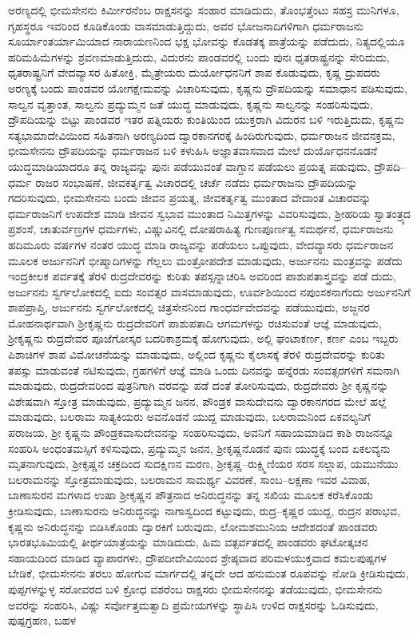 ಅರಣ್ಯದಲ್ಲಿ ಭೀಮಸೇನನು ಕಿರ್ಮೀರನೆಂಬ ರಾಕ್ಷಸನನ್ನು ಸಂಹಾರ ಮಾಡಿದುದು, ತೊಂಭತ್ತೆಂಟು ಸಹಸ್ರ ಮುನಿಗಳೂ, ಗೃಹಸ್ಥರೂ ಇವರಿಂದ ಕೂಡಿಕೊಂಡು ವಾಸಮಾಡುತ್ತಿದ್ದುದು, ಅವರ ಭೋಜನಾದಿಗಳಿಗಾಗಿ ಧರ್ಮರಾಜನು ಸೂರ್ಯಾಂತರ್ಯಾಮಿಯಾದ ನಾರಾಯಣನಿಂದ ಭಕ್ಷ ಭೋವನ್ನು ಕೊಡತಕ್ಕ ಪಾತ್ರೆಯನ್ನು ಪಡೆದುದು, ನಿತ್ಯದಲ್ಲಿಯೂ ಹರಿಮಹಿಮೆಗಳನ್ನು ಶ್ರವಣಮಾಡುತ್ತಿದುದು, ವಿದುರನು ಪಾಂಡವರಲ್ಲಿ ಬಂದು ಪುನಃ ಧೃತರಾಷ್ಟ್ರನನ್ನು ಸೇರಿದುದು, ಧೃತರಾಷ್ಟ್ರನಿಗೆ ವೇದವ್ಯಾಸರ ಹಿತೋಕ್ತಿ, ಮೈತ್ರೇಯರು ದುರ್ಯೋಧನನಿಗೆ ಶಾಪ ಕೊಡುವುದು, ಕೃಷ್ಣ ದ್ರುಪದರು ಅರಣ್ಯಕ್ಕೆ ಬಂದು ಪಾಂಡವರ ಯೋಗಕ್ಷೇಮವನ್ನು ವಿಚಾರಿಸುವುದು, ಕೃಷ್ಣನು ದ್ರೌಪದಿಯನ್ನು ಸಮಾಧಾನ ಪಡಿಸುವುದು, ಸಾಲ್ವನ ವೃತ್ತಾಂತ, ಸಾಲ್ವನು ಪ್ರದ್ಯುಮ್ಮನ ಜತೆ ಯುದ್ಧ ಮಾಡುವುದು, ಕೃಷ್ಣನು ಸಾಲ್ವನನ್ನು ಸಂಹರಿಸುವುದು, ದ್ರೌಪದಿಯನ್ನು ಬಿಟ್ಟು ಪಾಂಡವರ ಇತರ ಪತ್ನಿಯರು ಕುಂತಿಯಿಂದ ಯುಕ್ತರಾಗಿ ವಿದುರನ ಬಳಿ ಇರುತ್ತಿದುದು, ಕೃಷ್ಣನು ಸತ್ಯಭಾಮಾದೇವಿಯಿಂದ ಸಹಿತನಾಗಿ ಅರಣ್ಯದಿಂದ ದ್ವಾರಕಾನಗರಕ್ಕೆ ಹಿಂದಿರುಗುವುದು, ಧರ್ಮರಾಜನ ಜೀವನಕ್ರಮ, ಭೀಮಸೇನನು ದ್ರೌಪದಿಯನ್ನು ಧರ್ಮರಾಜನ ಬಳಿ ಕಳುಹಿಸಿ ಅಜ್ಞಾತವಾಸವಾದ ಮೇಲೆ ದುರ್ಯೊಧನನೊಡನೆ ಯುದ್ಧಮಾಡಿಯಾದರೂ ತನ್ನ ರಾಜ್ಯವನ್ನು ಪುನಃ ಪಡೆಯುವಂತೆ ವಾಗ್ದಾನ ಪಡೆಯಲು ಪ್ರಯತ್ನ ಪಡುವುದು, ದ್ರೌಪದಿ–ಧರ್ಮ ರಾಜರ ಸಂಭಾಷಣೆ, ಜೀವಕರ್ತೃತ್ವ ವಿಚಾರದಲ್ಲಿ ಚರ್ಚೆ ನಡೆದು ಧರ್ಮರಾಜನು ದ್ರೌಪದಿಯನ್ನು ಗದರಿಸುವುದು, ಭೀಮಸೇನನು ಬಂದು ಜೀವನ ಪ್ರಯತ್ನ, ಜೀವಕರ್ತೃತ್ವ ಮುಂತಾದ ವೇದಾಂತ ವಿಚಾರವನ್ನು ಧರ್ಮರಾಜನಿಗೆ ಉಪದೇಶ ಮಾಡಿ ಜೀವನ ಸ್ವಭಾವ ಮುಂತಾದ ನಿಮಿತ್ತಗಳನ್ನು ವಿವರಿಸುವುದು, ಶ‍್ರೀಹರಿಯ ಸ್ವಾತಂತ್ರ್ಯದ ಪ್ರಶಂಸೆ, ಚಾತುರ್ವಣ್ರಗಳ ಧರ್ಮಗಳು, ವಿಷ್ಣುವಿನಲ್ಲಿ ದೋಷರಾಹಿತ್ಯ ಗುಣಪೂರ್ಣತ್ವ ಸಮರ್ಥನೆ, ಧರ್ಮರಾಜನು ಹದಿಮೂರು ವರ್ಷಗಳ ನಂತರ ಯುದ್ಧ ಮಾಡಿ ರಾಜ್ಯವನ್ನು ಪಡೆಯಲು ಒಪ್ಪುವುದು, ವೇದವ್ಯಾಸರು ಧರ್ಮರಾಜನ ಮೂಲಕ ಅರ್ಜುನನಿಗೆ ಭೀಷ್ಮಾದಿಗಳನ್ನು ಗೆಲ್ಲಲು ಮಂತ್ರೋಪದೇಶ ಮಾಡುವುದು, ಅರ್ಜುನನು ಮಂತ್ರವನ್ನು ಪಡೆದು ಇಂದ್ರಕೀಲಕ ಪರ್ವತಕ್ಕೆ ತೆರಳಿ ರುದ್ರದೇವರನ್ನು ಕುರಿತು ತಪಸ್ಸನ್ನಾಚರಿಸಿ ಅವರಿಂದ ಪಾಶುಪತಾಸ್ತ್ರವನ್ನು ಪಡೆ ದುದು, ಅರ್ಜುನನು ಸ್ವರ್ಗಲೋಕದಲ್ಲಿ ಐದು ಸಂವತ್ಸರ ವಾಸಮಾಡುವುದು, ಊರ್ವಶಿಯಿಂದ ನಪುಂಸಕನಾಗೆಂದು ಅರ್ಜುನನಿಗೆ ಶಾಪಪ್ರಾಪ್ತಿ, ಅರ್ಜುನನು ಸ್ವರ್ಗಲೋಕದಲ್ಲಿ ಚಿತ್ರಸೇನನಿಂದ ಗಾಂಧರ್ವವೇದವನ್ನು ಪಡೆಯುವುದು, ಅಜ್ಜನರ ಮೋಹನಾರ್ಥವಾಗಿ ಶ‍್ರೀಕೃಷ್ಣನು ರುದ್ರದೇವರಿಗೆ ಪಾಶುಪತಾದಿ ಆಗಮಗಳನ್ನು ರಚಿಸುವಂತೆ ಆಜ್ಞೆ ಮಾಡುವುದು, ಶ‍್ರೀಕೃಷ್ಣನು ರುದ್ರದೇವರ ಪೂಜೆಗೋಸ್ಕರ ಬದರಿಕಾಶ್ರಮಕ್ಕೆ ಹೋಗುವುದು, ಅಲ್ಲಿ ಘಂಟಾಕರ್ಣ, ಕರ್ಣ ಎಂಬ ಇಬ್ಬರು ಪಿಶಾಚಿಗಳ ಶಾಪ ವಿಮೋಚನೆಯನ್ನು ಮಾಡುವುದು, ಅಲ್ಲಿಂದ ಕೃಷ್ಣನು ಕೈಲಾಸಕ್ಕೆ ತೆರಳಿ ರುದ್ರದೇವರನ್ನು ಕುರಿತು ತಪಸ್ಸು ಮಾಡುವಂತೆ ನಟಿಸುವುದು, ಗ್ರಹಗಳಿಗೆ ಆಜ್ಞೆ ಮಾಡಿ ಒಂದು ದಿನವನ್ನು ಹನ್ನೆರಡು ಸಂವತ್ಸರಗಳಿಗೆ ಸಮನಾಗಿ ಮಾಡುವುದು, ರುದ್ರದೇವರಿಂದ ಪುತ್ರನಿಗಾಗಿ ವರವನ್ನು ಪಡೆ ದಂತೆ ತೋರಿಸುವುದು, ರುದ್ರದೇವರು ಶ‍್ರೀ ಕೃಷ್ಣನನ್ನು ವಿಶೇಷವಾಗಿ ಸ್ತೋತ್ರ ಮಾಡುವುದು, ಪ್ರದ್ಯುಮ್ಮನ ಜನನ, ಪೌಂಡ್ರಕ ವಾಸುದೇವನು ದ್ವಾರಕಾನಗರದ ಮೇಲೆ ಹಲ್ಲೆ ಮಾಡುವುದು, ಬಲರಾಮ ಸಾತ್ಯಕಿಯರು ಅವನೊಡನೆ ಯುದ್ದ ಮಾಡುವುದು, ಬಲರಾಮನಿಂದ ಏಕವಲ್ಯನಿಗೆ ಪರಾಜಯ, ಶ‍್ರೀ ಕೃಷ್ಣನು ಪೌಂಡ್ರಕವಾಸುದೇವನನ್ನು ಸಂಹರಿಸುವುದು, ಅವನಿಗೆ ಸಹಾಯಮಾಡಿದ ಕಾಶಿ ರಾಜನನ್ನೂ ಸಂಹರಿಸಿ ಅಂಧಂತಮಸ್ಸಿಗೆ ಕಳಿಸುವುದು, ಪ್ರದ್ಯುಮ್ಮನ ಜನನ, ಶ‍್ರೀಕೃಷ್ಣನೊಡನೆ ಪುನಃ ಯುದ್ಧಕ್ಕೆ ಬಂದ ಏಕಲವ್ಯನು ಮೃತನಾಗುವುದು, ಶ‍್ರೀಕೃಷ್ಣನ ಚಕ್ರದಿಂದ ಸುದಕ್ಷಿಣನ ಮರಣ, ಶ‍್ರೀಕೃಷ್ಣ–ರುಕ್ಷ್ಮಿಣಿಯರ ಸರಸ ಸಲ್ಲಾಪ, ಯಮುನೆಯು ಬಲರಾಮನನ್ನು ಸ್ತೋತ್ರಮಾಡುವುದು, ಬಲರಾಮನ ಸಾಮರ್ಥ್ಯ ವಿವರಣೆ, ಸಾಂಬ–ಲಕ್ಷಣಾ ಇವರ ವಿವಾಹ, ಬಾಣಾಸುರನ ಮಗಳಾದ ಉಷಾ ಶ‍್ರೀಕೃಷ್ಣನ ಪೌತ್ರನಾದ ಅನಿರುದ್ಧನನ್ನು ತನ್ನ ಸಖಿಯ ಮೂಲಕ ಕರೆಸಿಕೊಂಡು ಕ್ರೀಡಿಸುವುದು, ಬಾಣಾಸುರನು ಅನಿರುದ್ಧನನ್ನು ನಾಗಾಸ್ವದಿಂದ ಕಟ್ಟುವುದು, ರುದ್ರ–ಕೃಷ್ಣರ ಯುದ್ದ, ರುದ್ರನ ಪರಾಭವ, ಕೃಷ್ಣನು ಅನಿರುದ್ಧನನ್ನು ಬಿಡಿಸಿಕೊಂಡು ದ್ವಾರಕಿಗೆ ಬರುವುದು, ಲೋಮಶಮುನಿಯ ಆದೇಶದಂತೆ ಪಾಂಡವರು ಭಾರತಭೂಮಿಯಲ್ಲಿ ತೀರ್ಥಯಾತ್ರೆಯನ್ನು ಮಾಡಿದುದು, ಹಿಮ ವತ್ಪರ್ವತದಲ್ಲಿ ಪಾಂಡವರು ಘಟೋತ್ಕಚನ ಸಹಾಯದಿಂದ ಮಾಡಿದ ವ್ಯಾಪಾರಗಳು, ದ್ರೌಪದೀದೇವಿಯಿಂದ ಶ್ರೇಷ್ಠವಾದ ಪರಿಮಳಯುಕ್ತವಾದ ಕಮಲಪುಷ್ಪಗಳ ಬೇಡಿಕೆ, ಭೀಮಸೇನನು ತರಲು ಹೋಗುವ ಮಾರ್ಗದಲ್ಲಿ ತನ್ನದೇ ಆದ ಹನುಮಂತ ರೂಪವನ್ನು ನೋಡಿ ಕ್ರೀಡಿಸುವುದು, ಪುಪ್ಪಗಳನ್ನುಳ್ಳ ಸರೋವರದ ಬಳಿ ಕ್ರೋಧ ವಶರೆಂಬ ರಾಕ್ಷಸರು ಭೀಮಸೇನನನ್ನು ತಡೆಯುವುದು, ಭೀಮಸೇನನು ಅವರನ್ನು ಸಂಹರಿಸಿ, ವಿಷ್ಣು ಸರ್ವೋತ್ತಮತ್ವಾದಿ ಪ್ರಮೇಯಗಳನ್ನು ಸ್ಥಾಪಿಸಿ ಉಳಿದ ರಾಕ್ಷಸರನ್ನು ಓಡಿಸುವುದು, ಪುಷ್ಪಗ್ರಹಣ, ಬಹಳ 